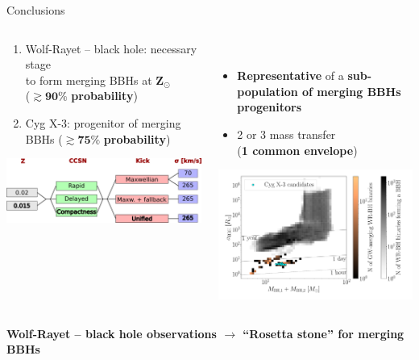 \documentclass{beamer} %
\begin{document}
\begin{frame}{Conclusions}
	\scriptsize
	\begin{columns}
		\begin{column}{0.6\textwidth}
			\begin{enumerate}
				\item Wolf-Rayet -- black hole: necessary stage \\ to form merging BBHs at $\boldsymbol{Z_\odot}$ \\
				($\bm{\gtrsim} \textbf{90}\%$ \textbf{probability}) 
				\item Cyg X-3: progenitor of merging BBHs ($\bm{\gtrsim} \textbf{75}\%$ \textbf{probability}) 
			\end{enumerate}	
			\bigskip	
			\includegraphics[width=\textwidth]{./images/parameterspace.png}
		\end{column}
		\begin{column}{0.5\textwidth}
			\\
			\begin{itemize}
				\item \textbf{Representative} of a \textbf{sub-population of merging BBHs progenitors}
				\item 2 or 3 mass transfer \\(\textbf{1 common envelope})
			\end{itemize}
			\smallskip
			\includegraphics[width=\textwidth]{./images/avsMtotREMBHBH_GW_WRBH_BHBH_GW_WRBH_cyg_x-3--Ko17.pdf}			
			\vspace{-1.1cm}
		\end{column}
	\end{columns}
	\bigskip
	\bigskip
	\centering
	\textbf{Wolf-Rayet -- black hole observations $\rightarrow$ ``Rosetta stone'' for merging BBHs}\\
	\bigskip
	\small
	

\end{frame}
\end{document}
